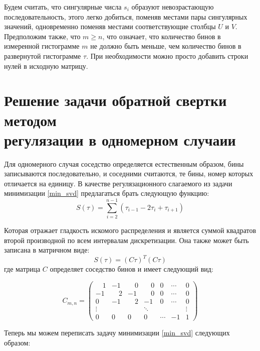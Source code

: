 \documentclass[a4paper,12pt]{diplom}
\renewcommand{\geq}{\geqslant}
\begin{document}
Будем считать, что сингулярные числа $s_{i}$ образуют невозрастающую последовательность, этого легко добиться, поменяв местами пары сингулярных 
значений, одновременно поменяв местами соответствующие столбцы $U$ и $V$. Предположим также, что $m \geq n$, что означает, 
что количество бинов в измеренной гистограмме $m$ не должно быть меньше, чем количество бинов в развернутой гистограмме $\tau$. 
При необходимости можно просто добавить строки нулей в исходную матрицу.




\section[Одномерный случай]{Решение задачи обратной свертки методом \\ регулязации в одномерном случаии}

Для одномерного случая соседство определяется естественным образом, бины записываются последовательно, и соседними считаются, те бины, номер 
которых отличается на единицу. В качестве регулязационного слагаемого из задачи минимизации \eqref{min_svd} предлагаться брать следующую функцию:
\begin{equation}
    S(\tau)= \sum_{i=2}^{n-1} (\tau_{i-1} - 2\tau_{i} + \tau_{i+1})
\end{equation}

Которая отражает гладкость искомого распределения и является суммой квадратов второй производной по всем интервалам дискретизации. 
Она также может быть записана в матричном виде:
\begin{equation}
    S(\tau) = (C\tau)^T(C\tau)
\end{equation}
где матрица $C$ определяет соседство бинов и имеет следующий вид:

\begin{equation}
    C_{m,n} = 
 \begin{pmatrix}
   \quad 1 &       -1 &  \quad 0 &  \quad 0 & 0 & \cdots & 0 \\
        -1 &  \quad 2 &       -1 &  \quad 0 & 0 & \cdots & 0 \\
         0 &       -1 & \quad  2 &       -1 & 0 & \cdots & 0 \\
  \vdots &  & & \ddots & & & \vdots \\
  0  & 0  & 0 & 0 & \cdots & -1 & 1
 \end{pmatrix}
 \label{one_dim_neighbors_mat}
\end{equation}

Теперь мы можем переписать задачу минимизации \eqref{min_svd} следующих образом:
\end{document}
